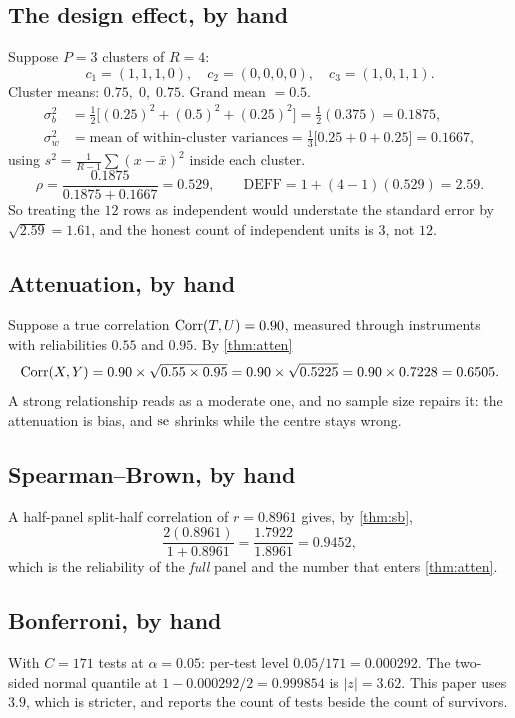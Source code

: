 \subsection{The design effect, by hand}
Suppose $P=3$ clusters of $R=4$:
\[
c_1=(1,1,1,0),\quad c_2=(0,0,0,0),\quad c_3=(1,0,1,1).
\]
Cluster means: $0.75,\;0,\;0.75$. Grand mean $= 0.5$.
\begin{align*}
\sigma_b^2 &= \tfrac{1}{2}\big[(0.25)^2+(0.5)^2+(0.25)^2\big] = \tfrac{1}{2}(0.375)=0.1875,\\
\sigma_w^2 &= \text{mean of within-cluster variances} = \tfrac{1}{3}\big[0.25+0+0.25\big]=0.1667,
\end{align*}
using $s^2 = \tfrac{1}{R-1}\sum (x-\bar x)^2$ inside each cluster.
\[
\rho=\frac{0.1875}{0.1875+0.1667}=0.529,\qquad
\mathrm{DEFF}=1+(4-1)(0.529)=2.59 .
\]
So treating the $12$ rows as independent would understate the standard error by
$\sqrt{2.59}=1.61$, and the honest count of independent units is $3$, not $12$.

\subsection{Attenuation, by hand}
Suppose a true correlation $\operatorname{Corr}(T,U)=0.90$, measured through instruments with
reliabilities $0.55$ and $0.95$. By \cref{thm:atten}
\[
\operatorname{Corr}(X,Y)=0.90 \times \sqrt{0.55 \times 0.95}=0.90 \times \sqrt{0.5225}=0.90\times 0.7228=0.6505 .
\]
A strong relationship reads as a moderate one, and no sample size repairs it: the
attenuation is bias, and $\operatorname{se}$ shrinks while the centre stays wrong.

\subsection{Spearman--Brown, by hand}
A half-panel split-half correlation of $r=0.8961$ gives, by \cref{thm:sb},
\[
\frac{2(0.8961)}{1+0.8961}=\frac{1.7922}{1.8961}=0.9452 ,
\]
which is the reliability of the \emph{full} panel and the number that enters
\cref{thm:atten}.

\subsection{Bonferroni, by hand}
With $C=171$ tests at $\alpha=0.05$: per-test level $0.05/171=0.000292$. The
two-sided normal quantile at $1-0.000292/2 = 0.999854$ is $|z|=3.62$. This paper
uses $3.9$, which is stricter, and reports the count of tests beside the count of
survivors.

